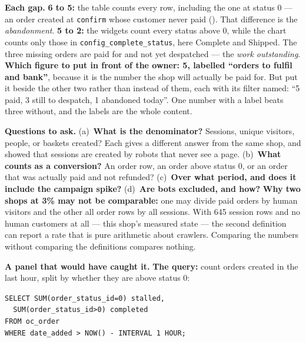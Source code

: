 \begin{ans}
  \item \textbf{Each gap.} \textbf{6 to 5:} the table counts every row,
        including the one at status 0 --- an order created at
        \texttt{confirm} whose customer never paid (). That
        difference is the \emph{abandonment}. \textbf{5 to 2:} the widgets count
        every status above 0, while the chart counts only those in
        \texttt{config\_complete\_status}, here Complete and Shipped. The three
        missing orders are paid for and not yet despatched --- the
        \emph{work outstanding}. \textbf{Which figure to put in front of the
        owner: 5, labelled ``orders to fulfil and bank''}, because it is the
        number the shop will actually be paid for. But put it beside the other
        two rather than instead of them, each with its filter named: ``5 paid,
        3 still to despatch, 1 abandoned today''. One number with a label beats
        three without, and the labels are the whole content.
  \item \textbf{Questions to ask.} (a)~\textbf{What is the denominator?}
        Sessions, unique visitors, people, or baskets created? Each gives a
        different answer from the same shop, and  showed that
        sessions are created by robots that never see a page. (b)~\textbf{What
        counts as a conversion?} An order row, an order above status 0, or an
        order that was actually paid and not refunded? (c)~\textbf{Over what
        period, and does it include the campaign spike?} (d)~\textbf{Are bots
        excluded, and how?} \textbf{Why two shops at 3\% may not be
        comparable:} one may divide paid orders by human visitors and the other
        all order rows by all sessions. With 645 session rows and no human
        customers at all --- this shop's measured state --- the second
        definition can report a rate that is pure arithmetic about crawlers.
        Comparing the numbers without comparing the definitions compares
        nothing.
  \item \textbf{A panel that would have caught it.} \textbf{The query:} count
        orders created in the last hour, split by whether they are above status
        0:
        \smallskip

        \texttt{SELECT SUM(order\_status\_id=0) stalled,}\\
        \texttt{\ \ SUM(order\_status\_id>0) completed}\\
        \texttt{FROM oc\_order}\\
        \texttt{WHERE date\_added > NOW() - INTERVAL 1 HOUR;}


\end{ans}
